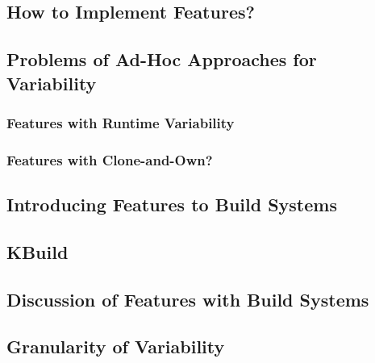 \subsection{How to Implement Features?}

\subsection{Problems of Ad-Hoc Approaches for Variability}
\subsubsection{Features with Runtime Variability}

\subsubsection{Features with Clone-and-Own?}

\subsection{Introducing Features to Build Systems}

\subsection{KBuild}

\subsection{Discussion of Features with Build Systems}

\subsection{Granularity of Variability}

